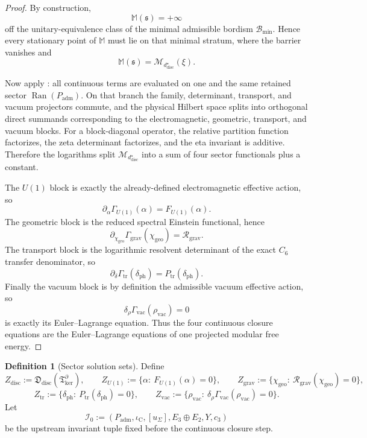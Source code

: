 \documentclass[11pt,a4paper]{article}
\theoremstyle{definition}
\newtheorem{definition}[theorem]{Definition}
\theoremstyle{remark}
\newcommand{\iC}{\iota_{\mathrm C}}
\newcommand{\cthree}{c_3}
\newcommand{\chigeo}{\chi_{\mathrm{geo}}}
\newcommand{\Tker}{\mathfrak T_{\mathrm{ker}}}
\newcommand{\Padm}{P_{\mathrm{adm}}}
\begin{document}
\begin{proof}
By construction,
\[
\mathbb M(\mathfrak s)=+\infty
\]
off the unitary-equivalence class of the minimal admissible bordism $\mathcal B_{\min}$. Hence every
stationary point of $\mathbb M$ must lie on that minimal stratum, where the barrier vanishes and
\[
\mathbb M(\mathfrak s)=\mathcal M_{d^\star_{\mathrm{disc}}}(\xi).
\]

Now apply : all continuous terms are evaluated on one and the
same retained sector $\operatorname{Ran}(\Padm)$. On that branch the family, determinant, transport,
and vacuum projectors commute, and the physical Hilbert space splits into orthogonal direct summands
corresponding to the electromagnetic, geometric, transport, and vacuum blocks. For a block-diagonal
operator, the relative partition function factorizes, the zeta determinant factorizes, and the eta
invariant is additive. Therefore the logarithms split $\mathcal M_{d^\star_{\mathrm{disc}}}$ into a
sum of four sector functionals plus a constant.

The $U(1)$ block is exactly the already-defined electromagnetic effective action, so
\[
\partial_\alpha\Gamma_{U(1)}(\alpha)=F_{U(1)}(\alpha).
\]
The geometric block is the reduced spectral Einstein functional, hence
\[
\partial_{\chigeo}\Gamma_{\mathrm{grav}}(\chigeo)=\mathcal R_{\mathrm{grav}}.
\]
The transport block is the logarithmic resolvent determinant of the exact $C_6$ transfer
denominator, so
\[
\partial_\delta\Gamma_{\mathrm{tr}}(\delta_{\mathrm{ph}})
=
P_{\mathrm{tr}}(\delta_{\mathrm{ph}}).
\]
Finally the vacuum block is by definition the admissible vacuum effective action, so
\[
\delta_\rho\Gamma_{\mathrm{vac}}(\rho_{\mathrm{vac}})=0
\]
is exactly its Euler--Lagrange equation. Thus the four continuous closure equations are the
Euler--Lagrange equations of one projected modular free energy.
\end{proof}

\begin{definition}[Sector solution sets]
\label{def:intrinsic-closure-map}
\label{def:core-closure-functional}
\label{def:sector-solution-sets}
Define
\[
Z_{\mathrm{disc}}:=\mathfrak D_{\mathrm{disc}}(\Tker^\partial),
\qquad
Z_{U(1)}:=\{\alpha:\ F_{U(1)}(\alpha)=0\},
\qquad
Z_{\mathrm{grav}}:=\{\chigeo:\ \mathcal R_{\mathrm{grav}}(\chigeo)=0\},
\]
\[
Z_{\mathrm{tr}}:=\{\delta_{\mathrm{ph}}:\ P_{\mathrm{tr}}(\delta_{\mathrm{ph}})=0\},
\qquad
Z_{\mathrm{vac}}:=\{\rho_{\mathrm{vac}}:\ \delta_\rho\Gamma_{\mathrm{vac}}(\rho_{\mathrm{vac}})=0\}.
\]
Let
\[
\mathcal I_0
:=
(\Padm,\iC,[u_\Sigma],E_3\oplus E_2,Y,\cthree)
\]
be the upstream invariant tuple fixed before the continuous closure step.
\end{definition}
\end{document}

